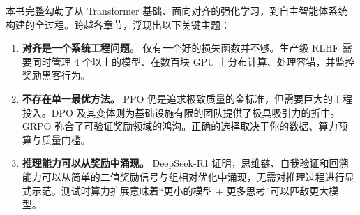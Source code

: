 本书完整勾勒了从 Transformer 基础、面向对齐的强化学习，到自主智能体系统构建的全过程。跨越各章节，浮现出以下关键主题：

\begin{enumerate}
  \item \textbf{对齐是一个系统工程问题。} 仅有一个好的损失函数并不够。生产级 RLHF 需要同时管理 4 个以上的模型、在数百块 GPU 上分布计算、处理容错，并监控奖励黑客行为。
  \item \textbf{不存在单一最优方法。} PPO 仍是追求极致质量的金标准，但需要巨大的工程投入。DPO 及其变体则为基础设施有限的团队提供了极具吸引力的折中。GRPO 弥合了可验证奖励领域的鸿沟。正确的选择取决于你的数据、算力预算与质量门槛。
  \item \textbf{推理能力可以从奖励中涌现。} DeepSeek-R1 证明，思维链、自我验证和回溯能力可以从简单的二值奖励信号与组相对优化中涌现，无需对推理过程进行显式示范。测试时算力扩展意味着“更小的模型 + 更多思考”可以匹敌更大模型。

\end{enumerate}
